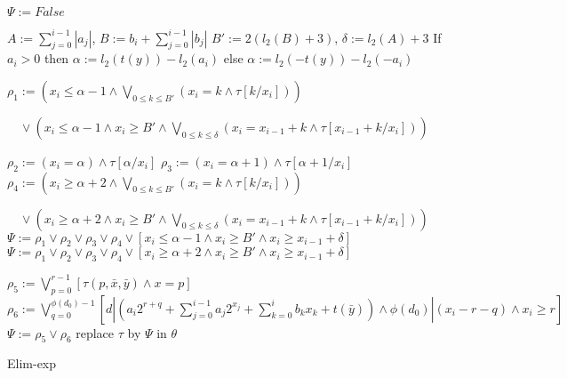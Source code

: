 {%

\begin{algorithm}[t]
    \SetAlgoLined
    
    {
        $\Psi:= \textit{False}$\;
        { 
            $A :=  \sum_{j=0}^{i-1}|a_j|$, $B:= b_i + \sum_{j=0}^{i-1}|b_j|$\;
            $B':= 2(l_2(B)+3)$, $\delta:=  l_2(A)+3$\;
            If $a_i>0$ then $\alpha := l_2(t(y))-l_2(a_i)$
            else $\alpha := l_2(-t(y))-l_2(-a_i)$\;
            
            $\rho_1 :=  (x_i \le \alpha -1 \wedge \bigvee_{0\le k\le B'}(x_i=k \wedge \tau[k/x_i] ))$
    
            $\quad \vee ( x_i \le \alpha -1 \wedge x_i\ge B' \wedge \bigvee_{0\le k \le \delta} (x_i = x_{i-1}+k \wedge \tau[x_{i-1}+k/x_i]))$\;
                
            $\rho_2 :=  (x_i = \alpha) \wedge \tau[\alpha/x_i]$\;
            $\rho_3 :=  (x_i = \alpha+1) \wedge \tau[\alpha+1/x_i]$\;
            $\rho_4 :=  (x_i \ge \alpha+2 \wedge \bigvee_{0\le k\le B'}(x_i=k \wedge \tau[k/x_i] ))$
        
            $\quad \vee (x_i \ge \alpha +2 \wedge x_i\ge B' \wedge \bigvee_{0\le k \le \delta}(x_i = x_{i-1}+k \wedge \tau[x_{i-1}+k/x_i]))
            $\;
            {
                $\Psi := \rho_1 \vee \rho_2 \vee \rho_3 \vee \rho_4 
                \vee [x_i \le \alpha -1 \wedge x_i \ge B' \wedge x_i \ge x_{i-1}+\delta]$
            }
            {
                $\Psi := \rho_1 \vee \rho_2 \vee \rho_3 \vee \rho_4 
                \vee [x_i \ge \alpha +2 \wedge x_i \ge B' \wedge x_i \ge x_{i-1}+\delta]$    
            }
            }
        {
            $\rho_5 := \bigvee_{p=0}^{r-1} [\tau(p,\bar{x},\bar{y})\wedge x=p]$\;
            $\rho_6 := \bigvee_{q=0}^{\phi(d_0)-1} [d|(a_i 2^{r+q}+\sum_{j=0}^{i-1} a_j 2^{x_j}
            +  \sum_{k=0}^{i} b_k x_k+t(\bar{y})) \wedge \phi(d_0)|(x_i-r-q) \wedge x_i \ge r]
            $\;
            $\Psi :=  \rho_5 \vee \rho_6$
        }
        replace $\tau$ by $\Psi$ in $\theta$\;
    }
    \caption{Elim-exp}
\end{algorithm}


}
